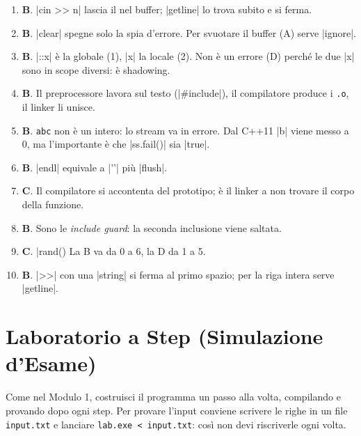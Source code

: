 \begin{soluzione}
\begin{enumerate}[label=\textbf{\arabic*.}]
  \item \textbf{B}. \cc|cin >> n| lascia il \nl{} nel buffer; \cc|getline| lo
        trova subito e si ferma.
  \item \textbf{B}. \cc|clear| spegne solo la spia d'errore. Per svuotare il
        buffer (A) serve \cc|ignore|.
  \item \textbf{B}. \cc|::x| è la globale (1), \cc|x| la locale (2). Non è un
        errore (D) perché le due \cc|x| sono in scope diversi: è shadowing.
  \item \textbf{B}. Il preprocessore lavora sul testo (\cc|#include|), il
        compilatore produce i \texttt{.o}, il linker li unisce.
  \item \textbf{B}. \texttt{abc} non è un intero: lo stream va in errore. Dal
        C++11 \cc|b| viene messo a 0, ma l'importante è che \cc|ss.fail()| sia \cc|true|.
  \item \textbf{B}. \cc|endl| equivale a \cc|'\n'| più \cc|flush|.
  \item \textbf{C}. Il compilatore si accontenta del prototipo; è il linker a non
        trovare il corpo della funzione.
  \item \textbf{B}. Sono le \emph{include guard}: la seconda inclusione viene saltata.
  \item \textbf{C}. \cc|rand() %
        La B va da 0 a 6, la D da 1 a 5.
  \item \textbf{B}. \cc|>>| con una \cc|string| si ferma al primo spazio; per la
        riga intera serve \cc|getline|.
\end{enumerate}
\end{soluzione}

\section{Laboratorio a Step (Simulazione d'Esame)}

Come nel Modulo 1, costruisci il programma un passo alla volta, compilando e
provando dopo ogni step. Per provare l'input conviene scrivere le righe in un
file \texttt{input.txt} e lanciare \texttt{lab.exe < input.txt}: così non devi
riscriverle ogni volta.

